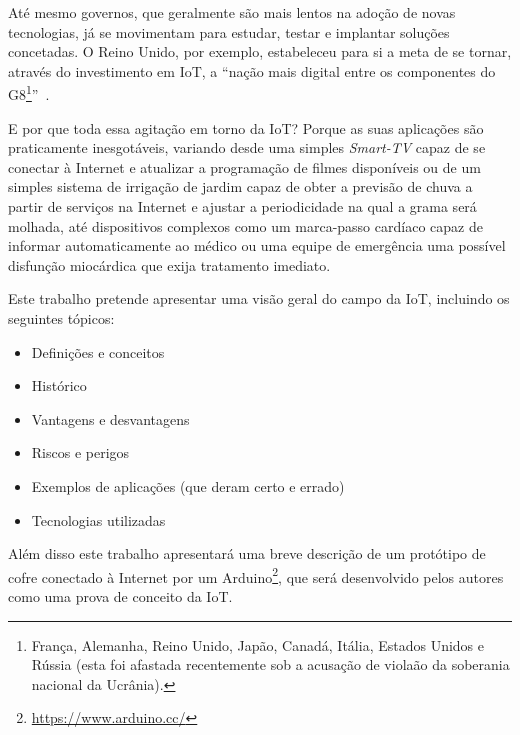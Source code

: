 \documentclass[pdftex, brazil, 12pt, twoside]{article}
\newcommand{\ingles}[1]{\textit{#1}}
\begin{document}
Até mesmo governos, que geralmente são mais lentos na adoção de novas tecnologias, já
se movimentam para estudar, testar e implantar soluções concetadas. O Reino Unido,
por exemplo, estabeleceu para si a meta de se tornar, através do investimento em IoT,
a ``nação mais digital entre os componentes do G8\footnote{França, Alemanha, Reino Unido,
  Japão, Canadá, Itália, Estados Unidos e Rússia (esta foi afastada recentemente sob
  a acusação de violaão da soberania nacional da Ucrânia).}''~\citep{UKGOSWalportIoT2014}.

E por que toda essa agitação em torno da IoT? Porque as suas aplicações
são praticamente inesgotáveis, variando desde uma simples
\ingles{Smart-TV} capaz de se conectar à Internet e atualizar a programação de
filmes disponíveis ou de um simples sistema de irrigação de jardim capaz de
obter a previsão de chuva a partir de serviços na Internet e ajustar a periodicidade
na qual a grama será molhada, até dispositivos complexos como um marca-passo cardíaco
capaz de informar automaticamente ao médico ou uma equipe de emergência uma possível
disfunção miocárdica que exija tratamento imediato.

Este trabalho pretende apresentar uma visão geral do campo da IoT, incluindo os
seguintes tópicos:

\begin{itemize}[noitemsep]
\item Definições e conceitos
\item Histórico
\item Vantagens e desvantagens
\item Riscos e perigos
\item Exemplos de aplicações (que deram certo e errado)
\item Tecnologias utilizadas
\end{itemize}

Além disso este trabalho apresentará uma breve descrição de um protótipo de
cofre conectado à Internet por um Arduino\footnote{\url{https://www.arduino.cc/}},
que será desenvolvido pelos autores como uma prova de conceito da IoT.



\end{document}
